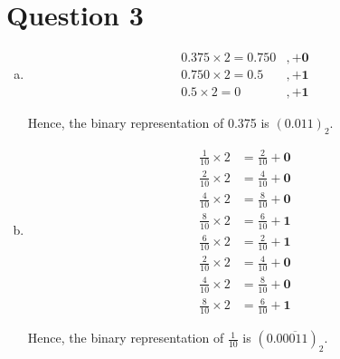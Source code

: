 \documentclass[12pt]{article}
\begin{document}
\section*{Question 3}
\begin{enumerate}[a.]
    \item

    \begin{align*}
        0.375 \times 2 = 0.750 &, + \textbf{0}\\
        0.750 \times 2 = 0.5 &, + \textbf{1}\\
        0.5 \times 2 = 0 &, + \textbf{1}
    \end{align*}

    Hence, the binary representation of 0.375 is $(0.011)_2$.

    \item

    \begin{align*}
        \frac{1}{10} \times 2 &= \frac{2}{10} + \textbf{0}\\
        \frac{2}{10} \times 2 &= \frac{4}{10} + \textbf{0}\\
        \frac{4}{10} \times 2 &= \frac{8}{10} + \textbf{0}\\
        \frac{8}{10} \times 2 &= \frac{6}{10} + \textbf{1}\\
        \frac{6}{10} \times 2 &= \frac{2}{10} + \textbf{1}\\
        \frac{2}{10} \times 2 &= \frac{4}{10} + \textbf{0}\\
        \frac{4}{10} \times 2 &= \frac{8}{10} + \textbf{0}\\
        \frac{8}{10} \times 2 &= \frac{6}{10} + \textbf{1}
    \end{align*}

    Hence, the binary representation of $\frac{1}{10}$ is $(0.0\overline{0011})_2$.

\end{enumerate}
\end{document}
